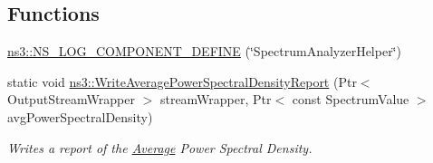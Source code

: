 \subsection*{Functions}
\begin{DoxyCompactItemize}
\item 
\hyperlink{namespacens3_a6ef304c56e168b007f51d120edc5fa12}{ns3\+::\+N\+S\+\_\+\+L\+O\+G\+\_\+\+C\+O\+M\+P\+O\+N\+E\+N\+T\+\_\+\+D\+E\+F\+I\+NE} (\char`\"{}Spectrum\+Analyzer\+Helper\char`\"{})
\item 
static void \hyperlink{group__spectrum_ga0f83c7e6ef0082eec9df1e99ffba29b7}{ns3\+::\+Write\+Average\+Power\+Spectral\+Density\+Report} (Ptr$<$ Output\+Stream\+Wrapper $>$ stream\+Wrapper, Ptr$<$ const Spectrum\+Value $>$ avg\+Power\+Spectral\+Density)
\begin{DoxyCompactList}\small\item\em Writes a report of the \hyperlink{classns3_1_1Average}{Average} Power Spectral Density. \end{DoxyCompactList}\end{DoxyCompactItemize}
